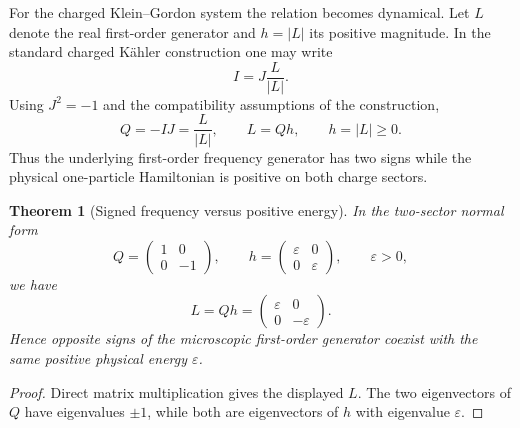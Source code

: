\documentclass[11pt]{article}
\newtheorem{theorem}{Theorem}[section]
\theoremstyle{definition}\newtheorem{definition}[theorem]{Definition}
\theoremstyle{remark}\newtheorem{remark}[theorem]{Remark}\newtheorem{conjecture}[theorem]{Conjecture}
\begin{document}
For the charged Klein--Gordon system the relation becomes dynamical. Let $L$ denote the real first-order generator and $h=|L|$ its positive magnitude. In the standard charged K\"ahler construction one may write~\cite{GerardJaekel2005}
\begin{equation}\label{eq:Kahlerenergycomplex}
 I=J\frac{L}{|L|}.
\end{equation}
Using $J^2=-1$ and the compatibility assumptions of the construction,
\begin{equation}\label{eq:QsignL}
 \boxed{Q=-IJ=\frac{L}{|L|}},
 \qquad
 \boxed{L=Qh},
 \qquad h=|L|\ge0.
\end{equation}
Thus the underlying first-order frequency generator has two signs while the physical one-particle Hamiltonian is positive on both charge sectors.

\begin{theorem}[Signed frequency versus positive energy]\label{thm:signedfreqpositive}
In the two-sector normal form
\begin{equation}
 Q=\begin{pmatrix}1&0\\0&-1\end{pmatrix},\qquad
 h=\begin{pmatrix}\varepsilon&0\\0&\varepsilon\end{pmatrix},\qquad \varepsilon>0,
\end{equation}
we have
\begin{equation}
 L=Qh=\begin{pmatrix}\varepsilon&0\\0&-\varepsilon\end{pmatrix}.
\end{equation}
Hence opposite signs of the microscopic first-order generator coexist with the same positive physical energy $\varepsilon$.
\end{theorem}
\begin{proof}
Direct matrix multiplication gives the displayed $L$. The two eigenvectors of $Q$ have eigenvalues $\pm1$, while both are eigenvectors of $h$ with eigenvalue $\varepsilon$.
\end{proof}
\end{document}
